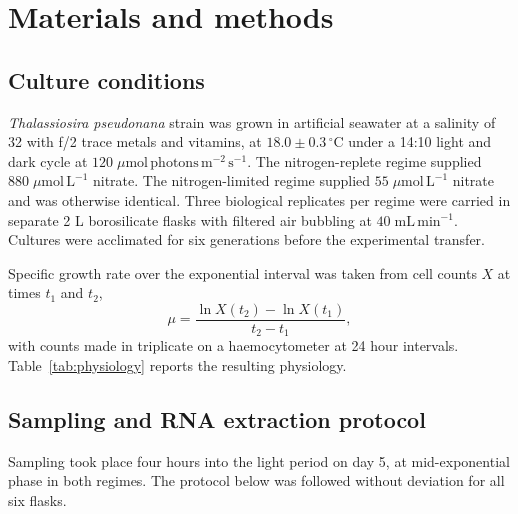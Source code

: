 \section{Materials and methods}
\label{sec:methods}

\subsection{Culture conditions}

\emph{Thalassiosira pseudonana} strain \strain{} was grown in artificial
seawater at a salinity of 32 with f/2 trace metals and vitamins, at
$18.0 \pm 0.3\,^{\circ}\mathrm{C}$ under a 14:10 light and dark cycle at
$120\;\mu\mathrm{mol\,photons\,m^{-2}\,s^{-1}}$. The nitrogen-replete regime
supplied $880\;\mu\mathrm{mol\,L^{-1}}$ nitrate. The nitrogen-limited regime
supplied $55\;\mu\mathrm{mol\,L^{-1}}$ nitrate and was otherwise identical.
Three biological replicates per regime were carried in separate 2 L
borosilicate flasks with filtered air bubbling at
$40\;\mathrm{mL\,min^{-1}}$. Cultures were acclimated for six generations
before the experimental transfer.

Specific growth rate over the exponential interval was taken from cell counts
$X$ at times $t_1$ and $t_2$,
\begin{equation}
  \label{eq:growth}
  \mu = \frac{\ln X(t_2) - \ln X(t_1)}{t_2 - t_1},
\end{equation}
with counts made in triplicate on a haemocytometer at 24 hour intervals.
Table~\ref{tab:physiology} reports the resulting physiology.

\subsection{Sampling and RNA extraction protocol}

Sampling took place four hours into the light period on day 5, at
mid-exponential phase in both regimes. The protocol below was followed without
deviation for all six flasks.

